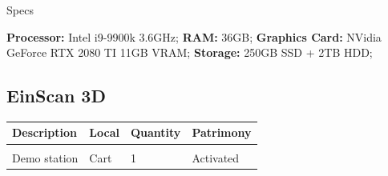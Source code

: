 {\Large Specs}
\vspace{1em}

\textbf{Processor:} Intel i9-9900k 3.6GHz; \textbf{RAM:} 36GB; \textbf{Graphics Card:} NVidia GeForce RTX 2080 TI 11GB VRAM; \textbf{Storage:} 250GB SSD + 2TB HDD;
\newpage


\subsection{EinScan 3D}
\begin{tabularx}{\textwidth}{ Y  Y  Y  Y }
    \textbf{Description} &  \textbf{Local} &  \textbf{Quantity} & \textbf{Patrimony}\\
    \hline \\
     Demo station & Cart & 1 & Activated
\end{tabularx}
\vspace{1cm}

